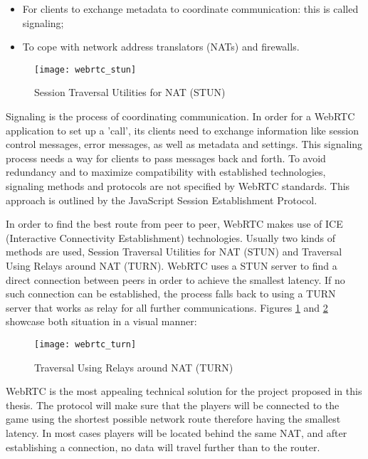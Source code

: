 \begin{itemize}

\item For clients to exchange metadata to coordinate communication: this is
called signaling;

\item To cope with network address translators (NATs) and firewalls.

\end{itemize}



\begin{figure}[!h]
\centering
\texttt{[image: webrtc\_stun]}
\caption{Session Traversal Utilities for NAT (STUN)}\label{fig:stun}
\end{figure}

Signaling is the process of coordinating communication. In order for a WebRTC
application to set up a 'call', its clients need to exchange information like
session control messages, error messages, as well as metadata and settings. This
signaling process needs a way for clients to pass messages back and forth. To
avoid redundancy and to maximize compatibility with established technologies,
signaling methods and protocols are not specified by WebRTC standards. This
approach is outlined by the JavaScript Session Establishment
Protocol\cite{jsep}.

In order to find the best route from peer to peer, WebRTC makes use of ICE
(Interactive Connectivity Establishment) technologies. Usually two kinds of
methods are used, Session Traversal Utilities for NAT (STUN) and Traversal Using
Relays around NAT (TURN). WebRTC uses a STUN server to find a direct connection
between peers in order to achieve the smallest latency. If no such connection
can be established, the process falls back to using a TURN server that works as
relay for all further communications. Figures \ref{fig:stun} and \ref{fig:turn}
showcase both situation in a visual manner:

\begin{figure}[!h]
\centering
\texttt{[image: webrtc\_turn]}
\caption{Traversal Using Relays around NAT (TURN)}\label{fig:turn}
\end{figure}

WebRTC is the most appealing technical solution for the project proposed in this
thesis. The protocol will make sure that the players will be connected to the
game using the shortest possible network route therefore having the smallest
latency. In most cases players will be located behind the same NAT, and after
establishing a connection, no data will travel further than to the router.


